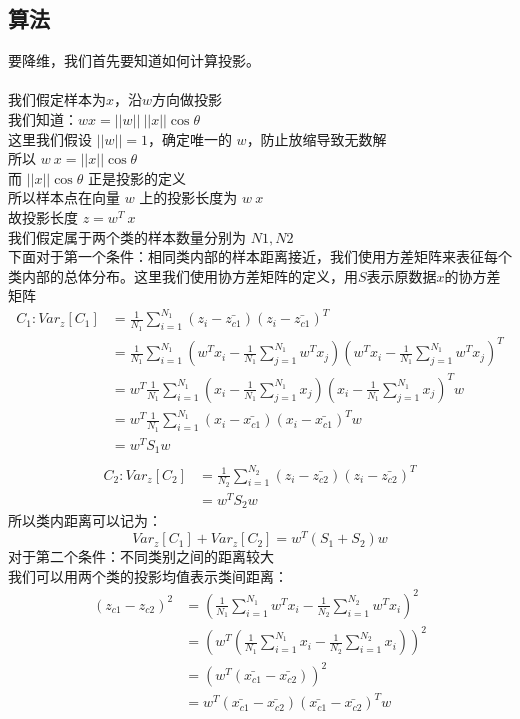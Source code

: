 \documentclass{report}
\begin{document}
\subsection{算法}
要降维，我们首先要知道如何计算投影。\\\\
我们假定样本为$x$，沿$w$方向做投影\\
我们知道：$w x=||w||\ ||x|| \cos{\theta}$\\
这里我们假设 $||w||=1$，确定唯一的 $w$，防止放缩导致无数解\\
所以 $w\ x=||x||\cos{\theta}$\\
而 $||x||\cos{\theta}$ 正是投影的定义\\
所以样本点在向量 $w$ 上的投影长度为 $w\ x$\\
故投影长度 $z=w^T\ x$\\
我们假定属于两个类的样本数量分别为 $N1,N2$\\
下面对于第一个条件：相同类内部的样本距离接近，我们使用方差矩阵来表征每个类内部的总体分布。这里我们使用协方差矩阵的定义，用$S$表示原数据$x$的协方差矩阵\\
\begin{equation}
\begin{aligned}C_1: Var_z[C_1]&=\frac{1}{N_1}\sum_{i=1}^{N_1} (z_i-\bar{z_{c1}})(z_i-\bar{z_{c1}})^T\\
&=\frac{1}{N_1}\sum_{i=1}^{N_1}(w^T x_i-\frac{1}{N_1}\sum_{j=1}^{N_1}w^T x_j)(w^T x_i-\frac{1}{N_1}\sum_{j=1}^{N_1}w^T x_j)^T \\&=w^T \frac{1}{N_1}\sum_{i=1}^{N_1}(x_i-\frac{1}{N_1}\sum_{j=1}^{N_1} x_j)(x_i-\frac{1}{N_1}\sum_{j=1}^{N_1} x_j)^T w\\&=w^{T} \frac{1}{N_{1}} \sum_{i=1}^{N_{1}}\left(x_{i}-\bar{x_{c 1}}\right)\left(x_{i}-\bar{x_{c 1}}\right)^{T} w\\&=w^T S_1 w\\
\end{aligned}
\end{equation}
\begin{equation}
\begin{aligned}
C_2: Var_z[C_2]&=\frac{1}{N_2}\sum_{i=1}^{N_2} (z_i-\bar{z_{c2}})(z_i-\bar{z_{c2}})^T\\&=w^T S_2 w
\end{aligned}
\end{equation}
所以类内距离可以记为：
$$
Var_z[C_1]+Var_z[C_2]=w^T(S_1+S_2)w
$$
对于第二个条件：不同类别之间的距离较大\\
我们可以用两个类的投影均值表示类间距离：
\begin{equation}
\begin{aligned}
(z_{c1}-z_{c2})^2&=(\frac{1}{N_1}\sum_{i=1}^{N_1}w^T x_i - \frac{1}{N_2}\sum_{i=1}^{N_2}w^T x_i)^2\\
&=(w^T(\frac{1}{N_1}\sum_{i=1}^{N_1} x_i - \frac{1}{N_2}\sum_{i=1}^{N_2} x_i))^2\\
&=(w^T(\bar{x_{c1}}-\bar{x_{c2}}))^2\\
&=w^T(\bar{x_{c1}}-\bar{x_{c2}})(\bar{x_{c1}}-\bar{x_{c2}})^T w
\end{aligned}
\end{equation}
\end{document}
